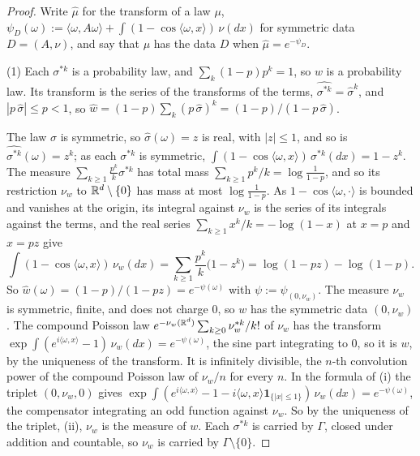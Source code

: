 \begin{proof}
Write $\widehat{\mu}$ for the transform of a law $\mu$, $\psi_D(\omega) := \langle\omega,
A\omega\rangle + \int(1 - \cos\langle\omega, x\rangle)\,\nu(dx)$ for symmetric data $D = (A, \nu)$,
and say that $\mu$ has the data $D$ when $\widehat{\mu} = e^{-\psi_D}$.

(1) Each $\sigma^{*k}$ is a probability law, and $\sum_k(1-p)p^k = 1$, so $w$ is a probability law.
Its transform is the series of the transforms of the terms, $\widehat{\sigma^{*k}} =
\widehat{\sigma}^k$, and $|p\,\widehat{\sigma}| \le p < 1$, so
$\widehat{w} = (1-p)\sum_k(p\,\widehat{\sigma})^k = (1-p)/(1 - p\,\widehat{\sigma})$.

The law $\sigma$ is symmetric, so $\widehat{\sigma}(\omega) = z$ is real, with $|z| \le 1$, and so
is $\widehat{\sigma^{*k}}(\omega) = z^k$; as each $\sigma^{*k}$ is symmetric,
$\int(1 - \cos\langle\omega, x\rangle)\,\sigma^{*k}(dx) = 1 - z^k$. The measure
$\sum_{k \ge 1}\tfrac{p^k}{k}\sigma^{*k}$ has total mass $\sum_{k \ge 1}p^k/k = \log\frac{1}{1-p}$,
and so its restriction $\nu_w$ to $\mathbb{R}^d \setminus \{0\}$ has mass at most $\log\frac{1}{1-p}$. As
$1 - \cos\langle\omega, \cdot\rangle$ is bounded and vanishes at the origin, its integral against
$\nu_w$ is the series of its integrals against the terms, and the real series
$\sum_{k \ge 1}x^k/k = -\log(1 - x)$ at $x = p$ and $x = pz$ give
\[
\int(1 - \cos\langle\omega, x\rangle)\,\nu_w(dx) = \sum_{k \ge 1}\frac{p^k}{k}\bigl(1 - z^k\bigr)
= \log(1 - pz) - \log(1 - p) .
\]
So $\widehat{w}(\omega) = (1-p)/(1-pz) = e^{-\psi(\omega)}$ with $\psi := \psi_{(0, \nu_w)}$. The
measure $\nu_w$ is symmetric, finite, and does not charge $0$, so $w$ has the symmetric data
$(0, \nu_w)$. The compound Poisson law $e^{-\nu_w(\mathbb{R}^d)}\sum_{k \ge 0}\nu_w^{*k}/k!$ of $\nu_w$ has
the transform $\exp\int(e^{i\langle\omega, x\rangle} - 1)\,\nu_w(dx) = e^{-\psi(\omega)}$, the sine
part integrating to $0$, so it is $w$, by the uniqueness of the transform. It is infinitely
divisible, the $n$-th convolution power of the compound Poisson law of $\nu_w/n$ for every $n$. In
the formula of (i) the triplet $(0, \nu_w, 0)$ gives
$\exp\int(e^{i\langle\omega, x\rangle} - 1 - i\langle\omega, x\rangle\mathbf 1_{\{|x| \le 1\}})\,
\nu_w(dx) = e^{-\psi(\omega)}$, the compensator integrating an odd function against $\nu_w$. So by
the uniqueness of the triplet, (ii), $\nu_w$ is the \Levy{} measure of $w$. Each
$\sigma^{*k}$ is carried by $\Gamma$, closed under addition and countable, so $\nu_w$ is carried by
$\Gamma \setminus \{0\}$.


\end{proof}
